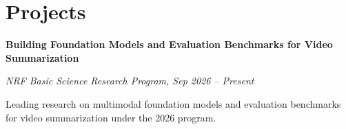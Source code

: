 \section{Projects}

\begin{onecolentry}
    \textbf{Building Foundation Models and Evaluation Benchmarks for Video Summarization}
    \par\textit{NRF Basic Science Research Program, Sep 2026 – Present}
    \par{\footnotesize Leading research on multimodal foundation models and evaluation benchmarks for video summarization under the 2026 program.}
\end{onecolentry}
